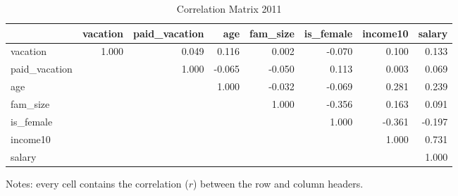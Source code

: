 \documentclass{article}
\begin{document}
    \begin{table}[h]
    \centering
    \hspace*{-1.5cm}
    \begin{tabular}{l|r|r|r|r|r|r|r}
                     & vacation & paid\_vacation &    age & fam\_size & is\_female & income10 & salary \\ \hline
      vacation       &    1.000 &          0.049 &  0.116 &     0.002 &     -0.070 &    0.100 &  0.133 \\ \hline
      paid\_vacation &          &          1.000 & -0.065 &    -0.050 &      0.113 &    0.003 &  0.069 \\ \hline
      age            &          &                &  1.000 &    -0.032 &     -0.069 &    0.281 &  0.239 \\ \hline
      fam\_size      &          &                &        &     1.000 &     -0.356 &    0.163 &  0.091 \\ \hline
      is\_female     &          &                &        &           &      1.000 &   -0.361 & -0.197 \\ \hline
      income10       &          &                &        &           &            &    1.000 &  0.731 \\ \hline
      salary         &          &                &        &           &            &          &  1.000
    \end{tabular}
    \hspace*{-1.5cm}
    \caption{Correlation Matrix 2011}
    \label{2011-correlation}
      Notes: every cell contains the correlation ($r$) between the row and column headers.
    \end{table}
\end{document}
